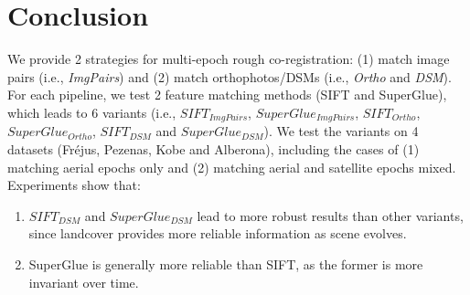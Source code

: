 \section{Conclusion}
We provide 2 strategies for multi-epoch rough co-registration: (1) match image pairs (i.e., \textit{ImgPairs}) and (2) match orthophotos/\ac{DSM}s (i.e., \textit{Ortho} and \textit{DSM}).
For each pipeline, we test 2 feature matching methods (SIFT and SuperGlue), which leads to 6 variants (i.e.,  $SIFT_{ImgPairs}$,  $SuperGlue_{ImgPairs}$,  $SIFT_{Ortho}$,  $SuperGlue_{Ortho}$,  $SIFT_{DSM}$ and  $SuperGlue_{DSM}$).
We test the variants on 4 datasets (Fr{\'e}jus, Pezenas, Kobe and Alberona), including the cases of (1) matching aerial epochs only and (2) matching aerial and satellite epochs mixed.
Experiments show that:\\
\begin{enumerate}
	\item $SIFT_{DSM}$ and $SuperGlue_{DSM}$ lead to more robust results than other variants, since landcover provides more reliable information as scene evolves.
	\item SuperGlue is generally more reliable than SIFT, as the former is more invariant over time.
\end{enumerate}


